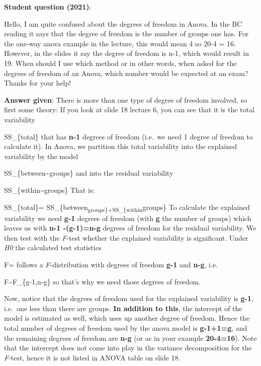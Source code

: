 \documentclass[
  letterpaper,
  8pt,
  a4paper]{book}
\begin{document}
\textbf{Student question (2021)}:

Hello, I am quite confused about the degrees of freedom in Anova. In the
BC reading it says that the degree of freedom is the number of groups
one has. For the one-way anova example in the lecture, this would mean 4
so 20-4 = 16. However, in the slides it say the degree of freedom is
n-1, which would result in 19. When should I use which method or in
other words, when asked for the degrees of freedom of an Anova, which
number would be expected at an exam? Thanks for your help!

\textbf{Answer given}: There is more than one type of degree of freedom
involved, so first some theory: If you look at slide 18 lecture 6, you
can see that it is the total variability

SS\_\{total\} that has \textbf{n-1} degrees of freedom (i.e.~we need 1
degree of freedom to calculate it). In Anova, we partition this total
variability into the explained variability by the model

SS\_\{between\textasciitilde groups\} and into the residual variability

SS\_\{within\textasciitilde groups\} That is:

SS\_\{total\}=
SS\_\{between\textsubscript{groups\}+SS\_\{within}groups\} To calculate
the explained variability we need \textbf{g-1} degrees of freedom (with
\textbf{g} the number of groups) which leaves us with \textbf{n-1
-(g-1)=n-g} degrees of freedom for the residual variability. We then
test with the \emph{F}-test whether the explained variability is
significant. Under \emph{H0} the calculated test statistics

F= follows a \emph{F}-distribution with degrees of
freedom \textbf{g-1} and \textbf{n-g}, i.e.~

F\sim F\_\{g-1,n-g\} so that's why we need those degrees of freedom.

Now, notice that the degrees of freedom used for the explained
variability is \textbf{g-1}, i.e.~one less than there are groups.
\textbf{In addition to this}, the intercept of the model is estimated as
well, which uses up another degree of freedom. Hence the total number of
degrees of freedom used by the anova model is \textbf{g-1+1=g}, and the
remaining degrees of freedom are \textbf{n-g} (or as in your example
\textbf{20-4=16}). Note that the intercept does not come into play in
the variance decomposition for the \emph{F}-test, hence it is not listed
in ANOVA table on slide 18.
\end{document}
